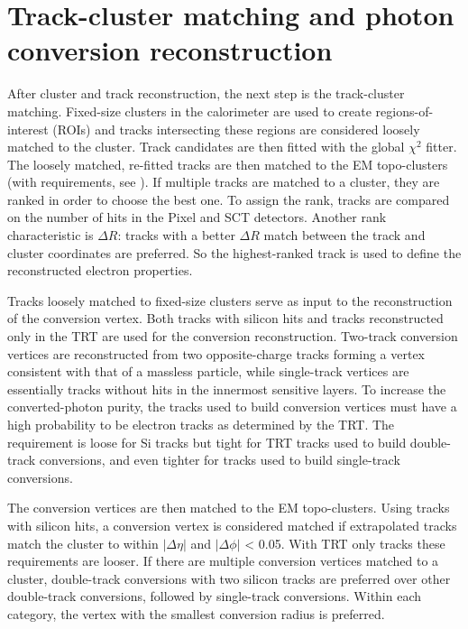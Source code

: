 \documentclass[a4paper, oneside]{book}
\begin{document}
		\section{Track-cluster matching and photon conversion reconstruction}
			\cite{El ph reco} After cluster and track reconstruction, the next step is the track-cluster matching. Fixed-size clusters in the calorimeter are used to create regions-of-interest (ROIs) and tracks intersecting
			these regions are considered loosely matched to the cluster. Track candidates are then fitted with the global $\chi^2$ fitter. The loosely matched, re-fitted tracks are then matched to the EM topo-clusters (with requirements, see \cite{El ph reco}).
			If multiple tracks are matched to a cluster, they are ranked in order to choose the best one. To assign the rank, tracks are compared on the number of hits in the Pixel and SCT detectors. Another rank characteristic is $\Delta R$: tracks with a better $\Delta R$ match between the track and cluster coordinates are preferred. So the highest-ranked track is used to define the reconstructed electron properties.
			
			Tracks loosely matched to fixed-size clusters serve as input to the reconstruction of the conversion vertex. Both tracks with silicon hits and tracks reconstructed only in the TRT are used for the conversion reconstruction. Two-track conversion vertices are reconstructed from two opposite-charge tracks forming a vertex consistent with that of a massless particle, while single-track vertices are essentially tracks without hits in the innermost sensitive layers. To increase the converted-photon purity, the tracks used to build conversion vertices must have a high probability to be electron tracks as determined by the TRT. The requirement is loose for Si tracks but tight for TRT tracks used to build double-track conversions, and even tighter for tracks used to build single-track conversions. 
			
			The conversion vertices are then matched to the EM topo-clusters. Using tracks with silicon hits, a conversion vertex is considered matched if extrapolated tracks
			match the cluster to within $|\Delta \eta|$ and $|\Delta \phi|$ < 0.05. With TRT only tracks these requirements are looser.
			If there are multiple conversion vertices matched to a cluster, double-track conversions with two silicon tracks are preferred over other double-track conversions, followed by single-track conversions. Within each category, the vertex with the smallest
			conversion radius is preferred.
			
\end{document}

